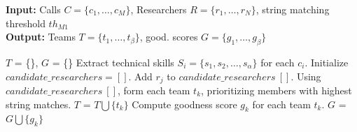 \begin{algorithm} 
	\caption{{\it M1:} Team Formation Using String Matching} 
 {\small
 \begin{flushleft}
        \hspace*{\algorithmicindent} 
        \textbf{Input:} Calls $C=\{c_1, \ldots, c_M\}$, Researchers $R=\{r_1, \ldots, r_N\}$, string matching threshold $th_{M1}$\\
        \hspace*{\algorithmicindent} 
        \textbf{Output:} Teams $T=\{t_1, \ldots, t_\beta\}$, good. scores
        $G=\{g_1, \ldots, g_\beta\}$
 \end{flushleft}
 \label{algo:m1}
	\begin{algorithmic}[1]
              \State $T$ = \{\}, $G$ = \{\}  
                \State Extract technical skills $S_i=\{s_1, s_2, \ldots, s_\alpha\}$ for each $c_i$.
                \State Initialize $candidate\_researchers=[]$.
                      \State Add $r_j$ to $candidate\_researchers~[]$. 
                      \EndIf
                    \EndFor
                \EndFor
            \State Using $candidate\_researchers~[]$, form each team $t_k$, prioritizing members with highest string matches.
            \State $T$ = $T \bigcup  \{t_k\}$ 
            \State Compute goodness score $g_k$ for each team $t_k$. 
            \State $G$ = $G \bigcup  \{g_k\}$ 

		      \EndFor
	\end{algorithmic} 
 }
\end{algorithm}
